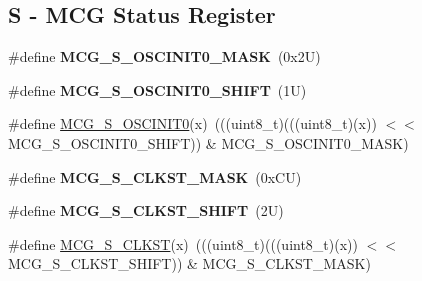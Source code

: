 \subsection*{S -\/ M\+CG Status Register}
\begin{DoxyCompactItemize}
\item 
\mbox{\label{group___m_c_g___register___masks_ga75a97c37fbe3689889ea81fd04f13805}} 
\#define {\bfseries M\+C\+G\+\_\+\+S\+\_\+\+O\+S\+C\+I\+N\+I\+T0\+\_\+\+M\+A\+SK}~(0x2\+U)
\item 
\mbox{\label{group___m_c_g___register___masks_ga3680bc3a628991bb5279d9d6b938b374}} 
\#define {\bfseries M\+C\+G\+\_\+\+S\+\_\+\+O\+S\+C\+I\+N\+I\+T0\+\_\+\+S\+H\+I\+FT}~(1\+U)
\item 
\#define \mbox{\hyperlink{group___m_c_g___register___masks_ga98c936496f313b82960d9de69a28ea69}{M\+C\+G\+\_\+\+S\+\_\+\+O\+S\+C\+I\+N\+I\+T0}}(x)~(((uint8\+\_\+t)(((uint8\+\_\+t)(x)) $<$$<$ M\+C\+G\+\_\+\+S\+\_\+\+O\+S\+C\+I\+N\+I\+T0\+\_\+\+S\+H\+I\+FT)) \& M\+C\+G\+\_\+\+S\+\_\+\+O\+S\+C\+I\+N\+I\+T0\+\_\+\+M\+A\+SK)
\item 
\mbox{\label{group___m_c_g___register___masks_gaf43507c78cdda211a04b5ae0509edb2e}} 
\#define {\bfseries M\+C\+G\+\_\+\+S\+\_\+\+C\+L\+K\+S\+T\+\_\+\+M\+A\+SK}~(0x\+C\+U)
\item 
\mbox{\label{group___m_c_g___register___masks_gab0768a667adb2dc2e1fb7972f9fd85a4}} 
\#define {\bfseries M\+C\+G\+\_\+\+S\+\_\+\+C\+L\+K\+S\+T\+\_\+\+S\+H\+I\+FT}~(2\+U)
\item 
\#define \mbox{\hyperlink{group___m_c_g___register___masks_ga891e8f2d733bebc7ab21cf49e0473b24}{M\+C\+G\+\_\+\+S\+\_\+\+C\+L\+K\+ST}}(x)~(((uint8\+\_\+t)(((uint8\+\_\+t)(x)) $<$$<$ M\+C\+G\+\_\+\+S\+\_\+\+C\+L\+K\+S\+T\+\_\+\+S\+H\+I\+FT)) \& M\+C\+G\+\_\+\+S\+\_\+\+C\+L\+K\+S\+T\+\_\+\+M\+A\+SK)
\end{DoxyCompactItemize}

